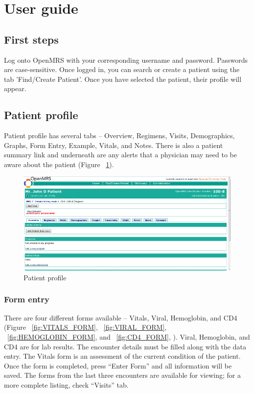 \documentclass[12pt,letterpaper]{article}
\begin{document}
\newpage 
\section{User guide} \label{sec:USER_GUIDE}

\subsection{First steps}
	Log onto OpenMRS with your corresponding username and password. Passwords are case-sensitive. Once logged in, you can search or create a patient using the tab 'Find/Create Patient'. Once you have selected the patient, their profile will appear.

\subsection{Patient profile}
	Patient profile has several tabs – Overview, Regimens, Visits, Demographics, Graphs, Form Entry, Example, Vitals, and Notes.  There is also a patient summary link and underneath are any alerts that a physician may need to be aware about the patient (Figure ~\ref{fig:PATIENT_PROFILE}).

\begin{figure}\begin{center}
\includegraphics[width=6.5in]{user_guide/patient_profile.png}
\end{center}
\caption{Patient profile}
\label{fig:PATIENT_PROFILE}
\end{figure}

\subsubsection{Form entry}
	There are four different forms available – Vitals, Viral, Hemoglobin, and CD4 (Figure ~\ref{fig:VITALS_FORM}, 
	~\ref{fig:VIRAL_FORM}, ~\ref{fig:HEMOGLOBIN_FORM}, 
	and ~\ref{fig:CD4_FORM}, 
	). Viral, Hemoglobin, and CD4 are for lab results. The encounter details must be filled along with the data entry. The Vitals form is an assessment of the current condition of the patient. Once the form is completed, press “Enter Form” and all information will be saved. 
	The forms from the last three encounters are available for viewing; for a more complete listing, check “Visits” tab.
\end{document}
